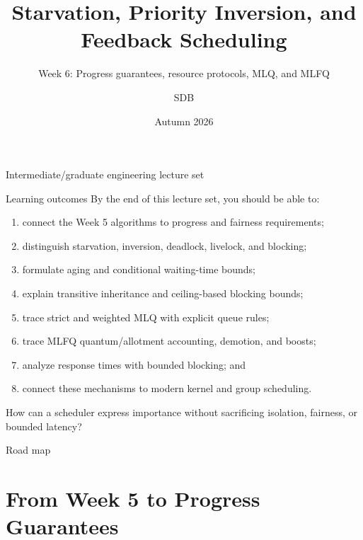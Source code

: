 \documentclass[aspectratio=169,11pt]{beamer}
\title[CPU Scheduling II]{Starvation, Priority Inversion, and Feedback Scheduling}
\subtitle{Week 6: Progress guarantees, resource protocols, MLQ, and MLFQ}
\author[SDB]{SDB}
\date{Autumn 2026}
\begin{document}
\begin{frame}
  \titlepage
  \vspace{-1.2em}
  \begin{center}
    \small Intermediate/graduate engineering lecture set
  \end{center}
\end{frame}

\begin{frame}{Learning outcomes}
  By the end of this lecture set, you should be able to:
  \begin{enumerate}
    \item connect the Week 5 algorithms to progress and fairness requirements;
    \item distinguish starvation, inversion, deadlock, livelock, and blocking;
    \item formulate aging and conditional waiting-time bounds;
    \item explain transitive inheritance and ceiling-based blocking bounds;
    \item trace strict and weighted MLQ with explicit queue rules;
    \item trace MLFQ quantum/allotment accounting, demotion, and boosts;
    \item analyze response times with bounded blocking; and
    \item connect these mechanisms to modern kernel and group scheduling.
  \end{enumerate}
  \begin{tcolorbox}[title=Guiding question,colback=osorange!5,colframe=osorange!70]
    How can a scheduler express importance without sacrificing isolation, fairness, or bounded latency?
  \end{tcolorbox}
\end{frame}

\begin{frame}{Road map}
  \footnotesize\tableofcontents
\end{frame}

\section{From Week 5 to Progress Guarantees}
\end{document}
